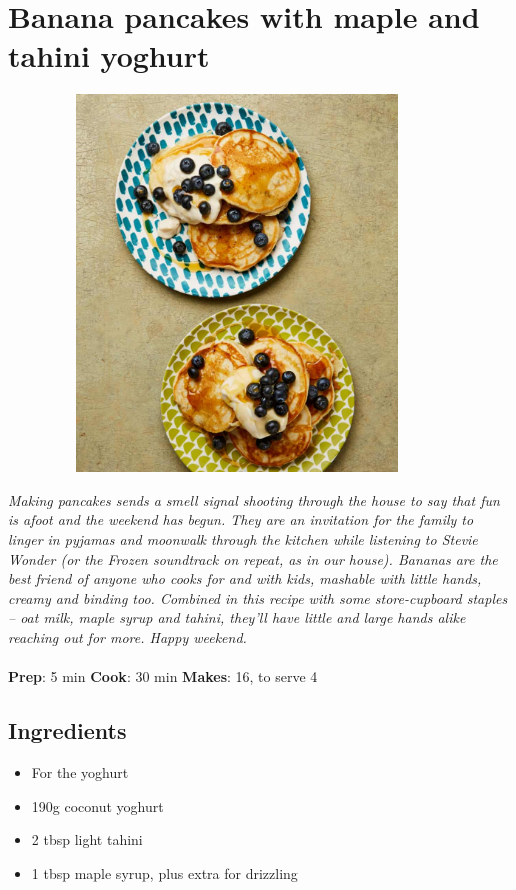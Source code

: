 \documentclass{book}
\begin{document}
\section{Banana pancakes with maple and tahini yoghurt}
\begin{figure}
\centering\includegraphics[width=10cm,height=10cm,keepaspectratio]{Recipe_Pictures/Banana_pancakes_with_maple_and_tahini_yoghurt.png}
\end{figure}
\emph{Making pancakes sends a smell signal shooting through the house to say that fun is afoot and the weekend has begun. They are an invitation for the family to linger in pyjamas and moonwalk through the kitchen while listening to Stevie Wonder (or the Frozen soundtrack on repeat, as in our house). Bananas are the best friend of anyone who cooks for and with kids, mashable with little hands, creamy and binding too. Combined in this recipe with some store-cupboard staples – oat milk, maple syrup and tahini, they’ll have little and large hands alike reaching out for more. Happy weekend.}\\\\ 
\textbf{Prep}: 5 min
\textbf{Cook}: 30 min
\textbf{Makes}: 16, to serve 4
\subsection*{Ingredients}
\begin{itemize}
\item For the yoghurt
\item 190g coconut yoghurt
\item 2 tbsp light tahini
\item 1 tbsp maple syrup, plus extra for drizzling
\end{itemize}
\end{document}
